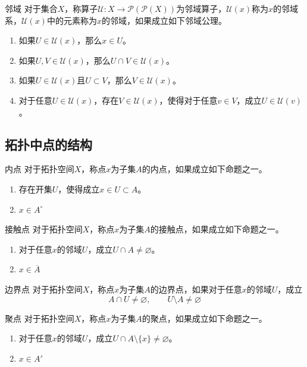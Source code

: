 \documentclass[lang = cn, scheme = chinese, thmcnt = section, usesamecnt]{elegantbook}
\newcommand{\sub}{\subset}             %
\begin{document}
\begin{definition}{邻域}
	对于集合$X$，称算子$\mathcal{U}:X\to\mathscr{P}(\mathscr{P}(X))$为邻域算子，$\mathcal{U}(x)$称为$x$的邻域系，$\mathcal{U}(x)$中的元素称为$x$的邻域，如果成立如下邻域公理。
	\begin{enumerate}
		\item 如果$U\in \mathcal{U}(x)$，那么$x\in U$。
		\item 如果$U,V\in\mathcal{U}(x)$，那么$U\cap V\in\mathcal{U}(x)$。
		\item 如果$U\in \mathcal{U}(x)$且$U\sub V$，那么$V\in\mathcal{U}(x)$。
		\item 对于任意$U\in\mathcal{U}(x)$，存在$V\in\mathcal{U}(x)$，使得对于任意$v\in V$，成立$U\in\mathcal{U}(v)$。
	\end{enumerate}
\end{definition}

\subsection{拓扑中点的结构}

\begin{definition}{内点}
	对于拓扑空间$X$，称点$x$为子集$A$的内点，如果成立如下命题之一。
	\begin{enumerate}
		\item 存在开集$U$，使得成立$x\in U\sub A$。
		\item $x\in A^\circ$
	\end{enumerate}
\end{definition}

\begin{definition}{接触点}
	对于拓扑空间$X$，称点$x$为子集$A$的接触点，如果成立如下命题之一。
	\begin{enumerate}
		\item 对于任意$x$的邻域$U$，成立$U\cap A\ne\varnothing$。
		\item $x\in \overline{A}$
	\end{enumerate}
\end{definition}

\begin{definition}{边界点}
	对于拓扑空间$X$，称点$x$为子集$A$的边界点，如果对于任意$x$的邻域$U$，成立%
	$$
	A\cap U\ne\varnothing,\qquad
	U\setminus A\ne\varnothing
	$$
\end{definition}

\begin{definition}{聚点}
	对于拓扑空间$X$，称点$x$为子集$A$的聚点，如果成立如下命题之一。
	\begin{enumerate}
		\item 对于任意$x$的邻域$U$，成立$U\cap A\setminus\{x\}\ne\varnothing$。
		\item $x\in A'$
	\end{enumerate}
\end{definition}
\end{document}
